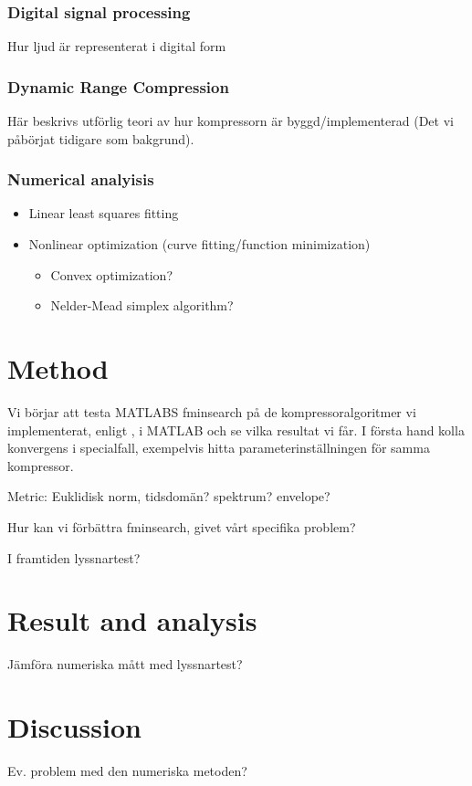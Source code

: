 \documentclass[]{article}
\begin{document}
\subsubsection{Digital signal processing}
Hur ljud är representerat i digital form

\subsubsection{Dynamic Range Compression}
Här beskrivs utförlig teori av hur kompressorn är byggd/implementerad (Det vi påbörjat tidigare som bakgrund). 

\subsubsection{Numerical analyisis}
\begin{itemize}
\item Linear least squares fitting
\item Nonlinear optimization (curve fitting/function minimization)

\begin{itemize}
\item Convex optimization?
\item Nelder-Mead simplex algorithm?
\end{itemize}

\end{itemize}

\section{Method}
Vi börjar att testa MATLABS fminsearch på de kompressoralgoritmer vi implementerat, enligt \cite{giannoullis}, i MATLAB och se vilka resultat vi får. I första hand kolla konvergens i specialfall, exempelvis hitta parameterinställningen för samma kompressor.

Metric: Euklidisk norm, tidsdomän? spektrum? envelope?

Hur kan vi förbättra fminsearch, givet vårt specifika problem?

I framtiden lyssnartest?

\section{Result and analysis}
Jämföra numeriska mått med lyssnartest?

\section{Discussion}
Ev. problem med den numeriska metoden?



\end{document}
